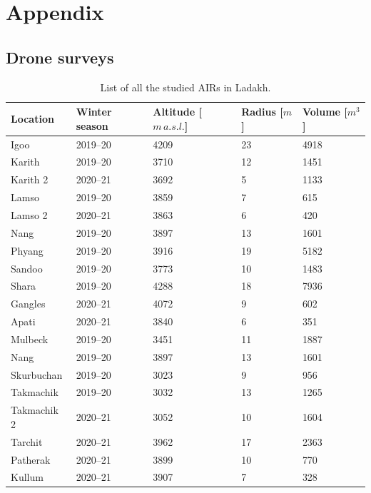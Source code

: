 %
\chapter{Appendix}
\label{sec:appendix}


\section{Drone surveys}

\begin{table}
  \centering
  \caption{List of all the studied AIRs in Ladakh.}
	\label{tab:Ladakh_AIRs}
	\begin{tabular}{|lllll|}
    \hline
    \textbf{Location}     & \textbf{Winter season} & \textbf{Altitude [$m\,a.s.l.$]} & \textbf{
    Radius [$m$]} & \textbf{Volume [$m^3$]} \\ \hline
    Igoo & 2019--20 & 4209 & 23 & 4918  \\
    Karith & 2019--20 & 3710 & 12 & 1451  \\
    Karith 2 & 2020--21 & 3692 & 5 & 1133  \\
    Lamso & 2019--20 & 3859 & 7 & 615  \\
    Lamso 2& 2020--21 & 3863 & 6 & 420  \\
    Nang& 2019--20 & 3897 & 13 & 1601 \\
    Phyang& 2019--20 & 3916 & 19 & 5182 \\
    Sandoo& 2019--20 & 3773 & 10 & 1483 \\
    Shara& 2019--20 & 4288 & 18 & 7936 \\
    Gangles& 2020--21 & 4072 & 9 & 602 \\
    Apati& 2020--21 & 3840 & 6 & 351 \\
    Mulbeck& 2019--20 & 3451 & 11 & 1887\\
    Nang& 2019--20 & 3897 & 13 & 1601\\
    Skurbuchan& 2019--20 & 3023 & 9 & 956\\
    Takmachik& 2019--20 & 3032 & 13 &1265\\
    Takmachik 2& 2020--21 & 3052 & 10 &1604\\
    Tarchit& 2020--21 & 3962 & 17 &2363\\
    Patherak& 2020--21 & 3899 & 10 &770\\
    Kullum& 2020--21 & 3907 & 7 &328\\ \hline
	\end{tabular}
\end{table}

